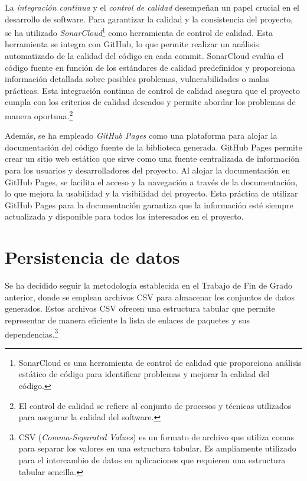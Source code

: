 La \textit{integración continua} y el \textit{control de calidad} desempeñan un papel crucial en el desarrollo de software. 
Para garantizar la calidad y la consistencia del proyecto, se ha utilizado \textit{SonarCloud}\footnote{SonarCloud es una herramienta de control de calidad que proporciona 
análisis estático de código para identificar problemas y mejorar la calidad del código.} como herramienta 
de control de calidad. Esta herramienta se integra con GitHub, lo que permite realizar un análisis 
automatizado de la calidad del código en cada commit. SonarCloud evalúa el código fuente en función 
de los estándares de calidad predefinidos y proporciona información detallada sobre posibles 
problemas, vulnerabilidades o malas prácticas. Esta integración continua de control de calidad 
asegura que el proyecto cumpla con los criterios de calidad deseados y permite abordar los 
problemas de manera oportuna.\footnote{El control de calidad se refiere al conjunto de procesos y técnicas utilizados para asegurar 
la calidad del software.}

Además, se ha empleado \textit{GitHub Pages} como una plataforma para alojar la documentación del código 
fuente de la biblioteca generada. GitHub Pages permite crear un sitio web estático que sirve 
como una fuente centralizada de información para los usuarios y desarrolladores del proyecto. 
Al alojar la documentación en GitHub Pages, se facilita el acceso y la navegación a través de 
la documentación, lo que mejora la usabilidad y la visibilidad del proyecto. Esta práctica de 
utilizar GitHub Pages para la documentación garantiza que la información esté siempre actualizada 
y disponible para todos los interesados en el proyecto.

\section{Persistencia de datos}

Se ha decidido seguir la metodología establecida en el Trabajo de Fin de Grado anterior, donde se 
emplean archivos CSV para almacenar los conjuntos de datos generados. Estos archivos CSV ofrecen una 
estructura tabular que permite representar de manera eficiente la lista de enlaces de paquetes y sus 
dependencias.\footnote{CSV (\textit{Comma-Separated Values}) es un formato de archivo que utiliza comas para 
separar los valores en una estructura tabular. Es ampliamente utilizado para el intercambio de datos 
en aplicaciones que requieren una estructura tabular sencilla.}


